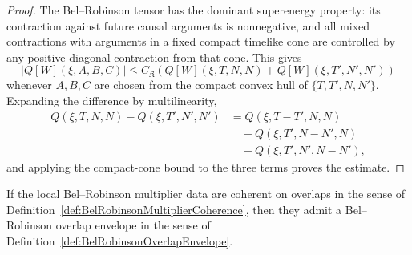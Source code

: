 \begin{proof}
The Bel--Robinson tensor has the dominant superenergy property: its contraction against future causal arguments is nonnegative, and all mixed contractions with arguments in a fixed compact timelike cone are controlled by any positive diagonal contraction from that cone. This gives
\[
    |Q[W](\xi,A,B,C)|
    \le
    C_{\mathfrak K}
    \left(
        Q[W](\xi,T,N,N)+Q[W](\xi,T',N',N')
    \right)
\]
whenever $A,B,C$ are chosen from the compact convex hull of $\{T,T',N,N'\}$. Expanding the difference by multilinearity,
\[
\begin{split}
    Q(\xi,T,N,N)-Q(\xi,T',N',N')
    &=
    Q(\xi,T-T',N,N)\\
    &\quad+
    Q(\xi,T',N-N',N)\\
    &\quad+
    Q(\xi,T',N',N-N'),
\end{split}
\]
and applying the compact-cone bound to the three terms proves the estimate.
\end{proof}

\begin{theorem}\label{thm:BelRobinsonCoherenceEnvelope}
If the local Bel--Robinson multiplier data are coherent on overlaps in the sense of Definition~\ref{def:BelRobinsonMultiplierCoherence}, then they admit a Bel--Robinson overlap envelope in the sense of Definition~\ref{def:BelRobinsonOverlapEnvelope}.
\end{theorem}

